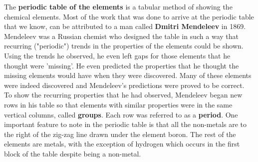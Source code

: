 The \textbf{periodic table of the elements} is a tabular method of showing the chemical elements. Most of the work that was done to arrive at the periodic table that we know, can be attributed to a man called \textbf{Dmitri Mendeleev} in 1869. Mendeleev was a Russian chemist who designed the table in such a way that recurring ("periodic") trends in the properties of the elements could be shown. Using the trends he observed, he even left gaps for those elements that he thought were 'missing'. He even predicted the properties that he thought the missing elements would have when they were discovered. Many of these elements were indeed discovered and Mendeleev's predictions were proved to be correct. \\

To show the recurring properties that he had observed, Mendeleev began new rows in his table so that elements with similar properties were in the same vertical columns, called \textbf{groups}. Each row was referred to as a \textbf{period}. One important feature to note in the periodic table is that all the non-metals are to the right of the zig-zag line drawn under the element boron. The rest of the elements are metals, with the exception of hydrogen which occurs in the first block of the table despite being a non-metal. 

